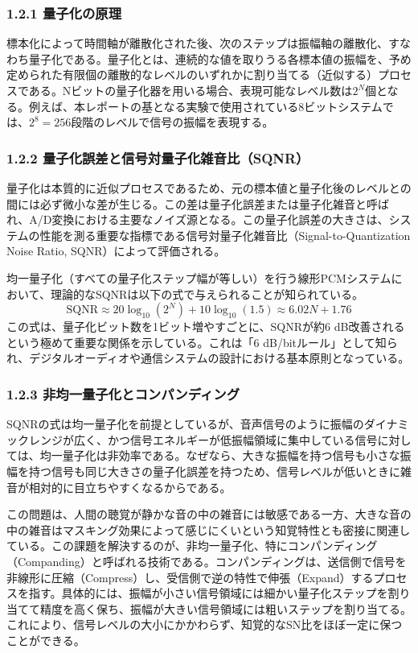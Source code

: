 \documentclass[
  a4paper,  %
  11pt,     %
]{ltjsarticle}%
\begin{document}
\subsubsection{1.2.1 量子化の原理}

標本化によって時間軸が離散化された後、次のステップは振幅軸の離散化、すなわち量子化である。量子化とは、連続的な値を取りうる各標本値の振幅を、予め定められた有限個の離散的なレベルのいずれかに割り当てる（近似する）プロセスである\cite{ref1}。Nビットの量子化器を用いる場合、表現可能なレベル数は$2^N$個となる。例えば、本レポートの基となる実験で使用されている8ビットシステムでは、$2^8=256$段階のレベルで信号の振幅を表現する\cite{ref1}。

\subsubsection{1.2.2 量子化誤差と信号対量子化雑音比（SQNR）}

量子化は本質的に近似プロセスであるため、元の標本値と量子化後のレベルとの間には必ず微小な差が生じる。この差は量子化誤差または量子化雑音と呼ばれ、A/D変換における主要なノイズ源となる\cite{ref10}。この量子化誤差の大きさは、システムの性能を測る重要な指標である信号対量子化雑音比（Signal-to-Quantization Noise Ratio, SQNR）によって評価される。

均一量子化（すべての量子化ステップ幅が等しい）を行う線形PCMシステムにおいて、理論的なSQNRは以下の式で与えられることが知られている\cite{ref10}。
\begin{equation}
  \text{SQNR} \approx 20\log_{10}(2^N) + 10\log_{10}(1.5) \approx 6.02N + 1.76
\end{equation}
この式は、量子化ビット数を1ビット増やすごとに、SQNRが約6 dB改善されるという極めて重要な関係を示している。これは「6 dB/bitルール」として知られ、デジタルオーディオや通信システムの設計における基本原則となっている。

\subsubsection{1.2.3 非均一量子化とコンパンディング}

SQNRの式は均一量子化を前提としているが、音声信号のように振幅のダイナミックレンジが広く、かつ信号エネルギーが低振幅領域に集中している信号に対しては、均一量子化は非効率である。なぜなら、大きな振幅を持つ信号も小さな振幅を持つ信号も同じ大きさの量子化誤差を持つため、信号レベルが低いときに雑音が相対的に目立ちやすくなるからである。

この問題は、人間の聴覚が静かな音の中の雑音には敏感である一方、大きな音の中の雑音はマスキング効果によって感じにくいという知覚特性とも密接に関連している。この課題を解決するのが、非均一量子化、特にコンパンディング（Companding）と呼ばれる技術である。コンパンディングは、送信側で信号を非線形に圧縮（Compress）し、受信側で逆の特性で伸張（Expand）するプロセスを指す。具体的には、振幅が小さい信号領域には細かい量子化ステップを割り当てて精度を高く保ち、振幅が大きい信号領域には粗いステップを割り当てる。これにより、信号レベルの大小にかかわらず、知覚的なSN比をほぼ一定に保つことができる。
\end{document}
